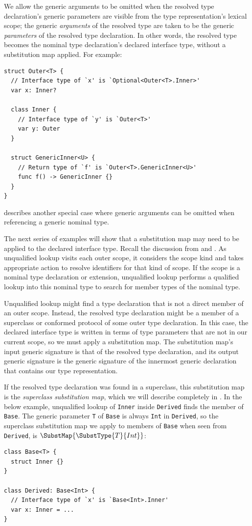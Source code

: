 \documentclass[../generics]{subfiles}
\begin{document}
We allow the generic arguments to be omitted when the resolved type declaration's generic parameters are visible from the type representation's lexical scope; the generic \emph{arguments} of the resolved type are taken to be the generic \emph{parameters} of the resolved type declaration. In other words, the resolved type becomes the nominal type declaration's declared interface type, without a substitution map applied. For example:
\begin{Verbatim}
struct Outer<T> {
  // Interface type of `x' is `Optional<Outer<T>.Inner>'
  var x: Inner?

  class Inner {
    // Interface type of `y' is `Outer<T>'
    var y: Outer
  }

  struct GenericInner<U> {
    // Return type of `f' is `Outer<T>.GenericInner<U>'
    func f() -> GenericInner {}
  }
}
\end{Verbatim}
 describes another special case where generic arguments can be omitted when referencing a generic nominal type.

The next series of examples will show that a substitution map may need to be applied to the declared interface type. Recall the discussion from  and . As unqualified lookup visits each outer scope, it considers the scope kind and takes appropriate action to resolve identifiers for that kind of scope. If the scope is a nominal type declaration or extension, unqualified lookup performs a qualified lookup into this nominal type to search for member types of the nominal type.

Unqualified lookup might find a type declaration that is not a direct member of an outer scope. Instead, the resolved type declaration might be a member of a superclass or conformed protocol of some outer type declaration. In this case, the declared interface type is written in terms of type parameters that are not in our current scope, so we must apply a substitution map. The substitution map's input generic signature is that of the resolved type declaration, and its output generic signature is the generic signature of the innermost generic declaration that contains our type representation.

If the resolved type declaration was found in a superclass, this substitution map is the \emph{superclass substitution map}, which we will describe completely in . In the below example, unqualified lookup of \texttt{Inner} inside \texttt{Derived} finds the member of \texttt{Base}. The generic parameter \texttt{T} of \texttt{Base} is always \texttt{Int} in \texttt{Derived}, so the superclass substitution map we apply to members of \texttt{Base} when seen from \texttt{Derived}, is $\SubstMap{\SubstType{T}{Int}}$:
\begin{Verbatim}
class Base<T> {
  struct Inner {}
}

class Derived: Base<Int> {
  // Interface type of `x' is `Base<Int>.Inner'
  var x: Inner = ...
}
\end{Verbatim}
\end{document}
